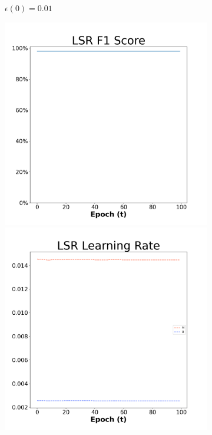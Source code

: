 \begin{figure}[H]
\begin{subfigure}{0.3\textwidth}
  \caption{$\epsilon(0)=0.01$}
\end{subfigure}\hfil %
\begin{subfigure}{0.3\textwidth}
  \includegraphics[width=\linewidth]{images/exper2/breast/LSR_0.03_f1.png}
  \includegraphics[width=\linewidth]{images/exper2/breast/LSR_0.03_lr.png}

\end{subfigure}
\end{figure}
